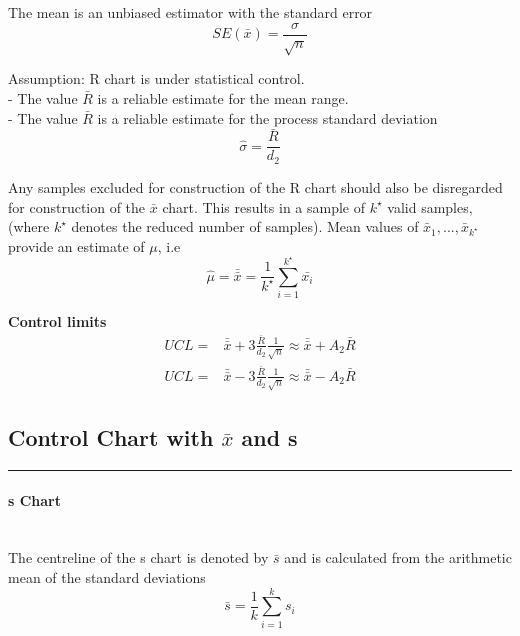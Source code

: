 The mean is an unbiased estimator with the standard error
\begin{equation}
  SE\left(\bar{x}\right) = \frac{\sigma}{\sqrt{n}}
\end{equation}

Assumption: R chart is under statistical control.\\
- The value $\bar{R}$ is a reliable estimate for the mean range.\\
- The value $\bar{R}$ is a reliable estimate for the process standard deviation
\begin{equation}
  \hat{\sigma} = \frac{\bar{R}}{d_2}
\end{equation}

Any samples excluded for construction of the R chart should also be disregarded for construction of the $\bar{x}$ chart.
This results in a sample of $k^\star$ valid samples, (where $k^\star$ denotes the reduced number of samples).
Mean values of $\bar{x}_1, ... ,\bar{x}_{k^\star}$ provide an estimate of $\mu$, i.e
\begin{equation}
  \hat{\mu} = \bar{\bar{x}} = \frac{1}{k^\star} \sum^{k^\star}_{i=1} \bar{x_i}
\end{equation}

\textbf{Control limits}
\begin{equation}
  \begin{split}
    UCL =& \bar{\bar{x}} + 3\frac{\bar{R}}{d_2} \frac{1}{\sqrt{n}}\approx \bar{\bar{x}} + A_2 \bar{R}\\
    UCL =& \bar{\bar{x}} - 3\frac{\bar{R}}{d_2} \frac{1}{\sqrt{n}}\approx \bar{\bar{x}} - A_2 \bar{R}
  \end{split}
\end{equation}

\subsection{Control Chart with $\bar{x}$ and s}
\noindent\rule[\linienAbstand]{\linewidth}{\linienDicke}

\paragraph{s Chart}\mbox{}\\
The centreline of the s chart is denoted by $\bar{s}$ and is calculated from the arithmetic mean of the standard deviations
\begin{equation}
  \bar{s} = \frac{1}{k} \sum^k_{i=1} s_i
\end{equation}


